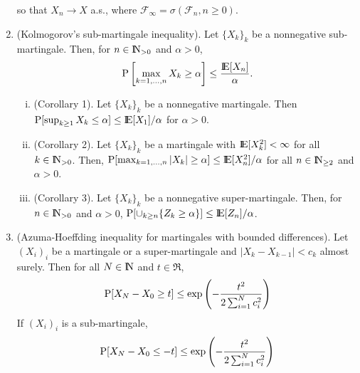 \documentclass[a4paper,10pt]{article}
\begin{document}
\begin{enumerate}
       so that $X_n\to X$ a.s., where $\mathcal{F}_\infty = \sigma(\mathcal{F}_n, n\geq 0)$.
 \item (Kolmogorov's sub-martingale inequality). Let $\{X_k\}_k$ be a nonnegative sub-martingale.
       Then, for $n\in\N_{>0}$ and $\alpha>0$,
       \[
        \prob\left[ \max_{k=1,\ldots, n}X_k \geq \alpha\right] \leq \frac{\E[X_n]}{\alpha}.
       \]
       \begin{enumerate}[i.]
        \item (Corollary 1). Let $\{X_k\}_k$ be a nonnegative martingale. 
              Then $\prob[\sup_{k\geq 1}X_k \leq \alpha]\leq\E[X_1]/\alpha$ for $\alpha>0$.
        \item (Corollary 2). Let $\{X_k\}_k$ be a martingale with $\E[X_k^2]< \infty$ for all $k\in\N_{>0}$. 
               Then, $\prob[\max_{k=1,\ldots, n}|X_k|\geq \alpha]\leq \E[X_n^2]/\alpha$ for all $n\in \N_{\geq 2}$
               and $\alpha>0$.
        \item (Corollary 3). Let $\{X_k\}_k$ be a nonnegative super-martingale. Then, for $n\in\N_{>0}$
              and $\alpha>0$, $\prob[\cup_{k\geq n}\{Z_k\geq \alpha\}]\leq\E[Z_n]/\alpha$.
       \end{enumerate}


 \item (Azuma-Hoeffding inequality for martingales with bounded differences). Let $(X_i)_i$
       be a martingale or a  super-martingale and $|X_k-X_{k-1}|<c_{k}$ almost surely. Then for all $N\in\N$
       and $t\in\Re$,
       \[
        \mathrm{P}[X_N-X_0\geq t] \leq \exp \left(-\frac{t^2}{2\sum_{i=1}^{N}c_i^2}\right)
       \]
       If $(X_i)_i$ is a sub-martingale, 
       \[
        \mathrm{P}[X_N-X_0\leq -t] \leq \exp \left(-\frac{t^2}{2\sum_{i=1}^{N}c_i^2}\right)
       \]

\end{enumerate}
\end{document}

